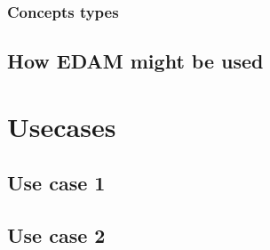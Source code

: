 \documentclass{scrartcl}
\begin{document}
\subsubsection{Concepts types} 

\subsection{How EDAM might be used}


\newpage

\section{Usecases}

\subsection{Use case 1}
\subsection{Use case 2}

\newpage
{}
\printbibliography %
\end{document}
